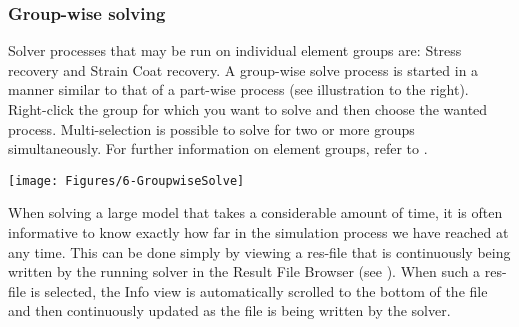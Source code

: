 {\clearpage

\subsubsection{Group-wise solving}

\noindent
\begin{minipage}{0.47\textwidth}
  \raggedright
  Solver processes that may be run on individual element groups are:
  Stress recovery and Strain Coat recovery.
  A group-wise solve process is started in a manner similar to that of
  a part-wise process (see illustration to the right). Right-click
  the group for which you want to solve and then choose the wanted process.
  Multi-selection is possible to solve for two or more groups simultaneously.
  For further information on element groups, refer to
  .
\end{minipage}%
\hfill\begin{minipage}{0.5\textwidth}
  \texttt{[image: Figures/6-GroupwiseSolve]}
\end{minipage}





When solving a large model that takes a considerable amount of time, it
is often informative to know exactly how far in the simulation process
we have reached at any time. This can be done simply by viewing a
res-file that is continuously being written by the running solver in the
Result File Browser (see ).
When such a res-file is selected,
the Info view is automatically scrolled to the bottom of the file
and then continuously updated as the file is being written by the solver.


}
